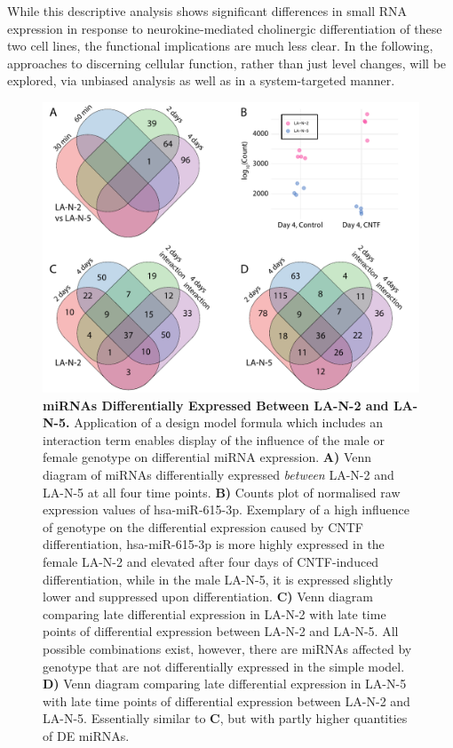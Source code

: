 While this descriptive analysis shows significant differences in small RNA expression in response to neurokine-mediated cholinergic differentiation of these two cell lines, the functional implications are much less clear. In the following, approaches to discerning cellular function, rather than just level changes, will be explored, via unbiased analysis as well as in a system-targeted manner.

\begin{figure}
\centering
\includegraphics[width=\textwidth]{figures/la2-vs-la5-overlap-venn}
\caption[miRNAs Differentially Expressed Between LA-N-2 and LA-N-5.]{\textbf{miRNAs Differentially Expressed Between LA-N-2 and LA-N-5.} Application of a design model formula which includes an interaction term enables display of the influence of the male or female genotype on differential miRNA expression. \textbf{A)} Venn diagram of miRNAs differentially expressed \emph{between} LA-N-2 and LA-N-5 at all four time points. \textbf{B)} Counts plot of normalised raw expression values of hsa-miR-615-3p. Exemplary of a high influence of genotype on the differential expression caused by CNTF differentiation, hsa-miR-615-3p is more highly expressed in the female LA-N-2 and elevated after four days of CNTF-induced differentiation, while in the male LA-N-5, it is expressed slightly lower and suppressed upon differentiation. \textbf{C)} Venn diagram comparing late differential expression in LA-N-2 with late time points of differential expression between LA-N-2 and LA-N-5. All possible combinations exist, however, there are miRNAs affected by genotype that are not differentially expressed in the simple model. \textbf{D)} Venn diagram comparing late differential expression in LA-N-5 with late time points of differential expression between LA-N-2 and LA-N-5. Essentially similar to \textbf{C}, but with partly higher quantities of DE miRNAs.
\label{fig:la2-vs-la5-overlap-venn}}
\end{figure}

